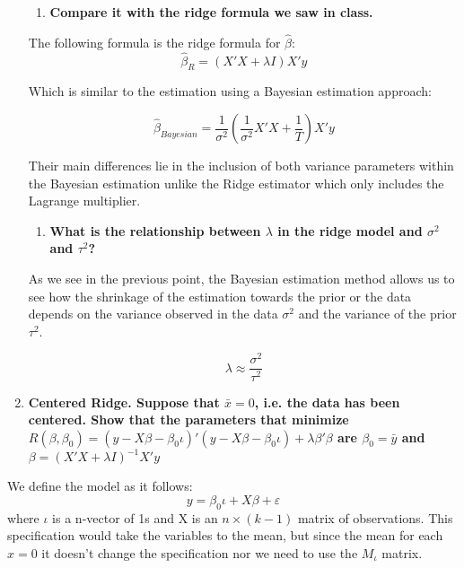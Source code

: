 \documentclass[12pt,onecolumn]{article}
\begin{document}
\begin{enumerate}
  \begin{enumerate}[resume]   
      \item \bf{Compare it with the ridge formula we saw in class.} 
  \end{enumerate}

  The following formula is the ridge formula for $\hat{\beta}$:
  \begin{equation*}
      \hat{\beta}_R=(X'X+\lambda{I})X'y
  \end{equation*}

  Which is similar to the estimation using a Bayesian estimation approach:

  \begin{equation*}
      \hat{\beta}_{Bayesian}=\frac{1}{\sigma^2}\left(\frac{1}{\sigma^2}X'X+\frac{1}{T}\right)X'y
  \end{equation*}

Their main differences lie in the inclusion of both variance parameters within the Bayesian estimation unlike the Ridge estimator which only includes the Lagrange multiplier.

  \begin{enumerate}[resume]    
      \item \bf{What is the relationship between $\lambda$ in the ridge model and $\sigma^2$ and $\tau^2$?}
  \end{enumerate}
  
  As we see in the previous point, the Bayesian estimation method allows us to see how the shrinkage of the estimation towards the prior or the data depends on the variance observed in the data $\sigma^2$ and the variance of the prior $\tau^2$.

  \begin{equation*}
      \lambda\approx\frac{\sigma^2}{\tau^2}
  \end{equation*}

    \item \bf{Centered Ridge. Suppose that $\bar x= 0$, i.e. the data has been centered. Show that the parameters that minimize $R(\beta,\beta_0) = (y-X\beta-\beta_0 \iota)'(y-X\beta-\beta_0 \iota)+ \lambda\beta'\beta$ are $\beta_0=\bar y$ and $\beta=(X'X+\lambda I)^{-1}X'y$}
\end{enumerate}
We define the model as it follows:
\begin{equation*}
    y=\beta_0\iota+X\beta+\varepsilon
\end{equation*}
where $\iota$ is a n-vector of 1s and X is an $n\times(k-1)$ matrix of observations. This specification would take the variables to the mean, but since the mean for each $x=0$ it doesn't change the specification nor we need to use the $M_\iota$ matrix.
\end{document}
